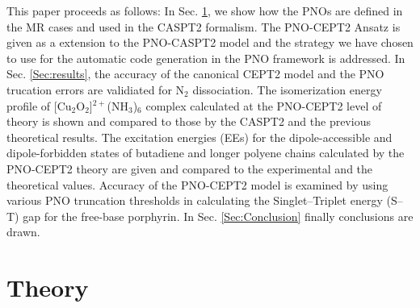 \documentclass[aip,jcp,amsmath]{revtex4-1}
\begin{document}
%
This paper proceeds as follows:
%
In Sec. \ref{Sec:theory}, we show how the PNOs are defined in the MR cases and used in the CASPT2 formalism.
%
The PNO-CEPT2 Ansatz is given as a extension to the PNO-CASPT2 model and the strategy we have chosen to use for the automatic code generation in the PNO framework is addressed.
%
In Sec. \ref{Sec:results}, the accuracy of the canonical CEPT2 model and the PNO trucation errors are validiated for N${}_2$ dissociation.
%
The isomerization energy profile of [Cu${}_2$O${}_2$]${}^{2+}$(NH${}_3$)${}_{6}$ complex calculated at the PNO-CEPT2 level of theory is shown and compared to those by the CASPT2 and the previous theoretical results.
%
The excitation energies (EEs) for the dipole-accessible and dipole-forbidden states of butadiene and longer polyene chains calculated by the PNO-CEPT2 theory are given and compared to the experimental and the theoretical values.
%
Accuracy of the PNO-CEPT2 model is examined by using various PNO truncation thresholds in calculating the Singlet--Triplet energy (S--T) gap for the free-base porphyrin.
%
In Sec. \ref{Sec:Conclusion} finally conclusions are drawn.

\section{Theory}\label{Sec:theory}
\end{document}
